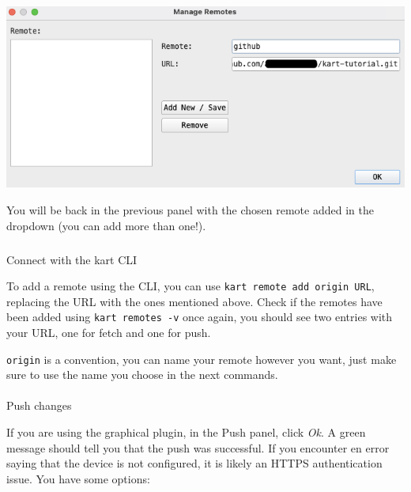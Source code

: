 \documentclass[
  letterpaper,
  DIV=11,
  numbers=noendperiod]{scrartcl}
\makeatletter
\let\oldparagraph\paragraph
\renewcommand{\paragraph}{
    \@ifstar
      \xxxParagraphStar
      \xxxParagraphNoStar
  }
\newcommand{\xxxParagraphStar}[1]{\oldparagraph*{#1}\mbox{}}
\newcommand{\xxxParagraphNoStar}[1]{\oldparagraph{#1}\mbox{}}
\let\oldsubparagraph\subparagraph
\renewcommand{\subparagraph}{
    \@ifstar
      \xxxSubParagraphStar
      \xxxSubParagraphNoStar
  }
\newcommand{\xxxSubParagraphStar}[1]{\oldsubparagraph*{#1}\mbox{}}
\newcommand{\xxxSubParagraphNoStar}[1]{\oldsubparagraph{#1}\mbox{}}
\makeatother
\begin{document}
\begin{center}
\includegraphics{img/kart-panel-remotes-add.png}
\end{center}

You will be back in the previous panel with the chosen remote added in
the dropdown (you can add more than one!).

\subparagraph{Connect with the kart
CLI}\label{connect-with-the-kart-cli}

To add a remote using the CLI, you can use
\texttt{kart\ remote\ add\ origin\ URL}, replacing the URL with the ones
mentioned above. Check if the remotes have been added using
\texttt{kart\ remotes\ -v} once again, you should see two entries with
your URL, one for fetch and one for push.

\begin{tcolorbox}[enhanced jigsaw, arc=.35mm, colbacktitle=quarto-callout-note-color!10!white, colframe=quarto-callout-note-color-frame, coltitle=black, breakable, left=2mm, bottomrule=.15mm, rightrule=.15mm, opacitybacktitle=0.6, titlerule=0mm, opacityback=0, toptitle=1mm, title=\textcolor{quarto-callout-note-color}{\faInfo}\hspace{0.5em}{Note}, toprule=.15mm, bottomtitle=1mm, colback=white, leftrule=.75mm]

\texttt{origin} is a convention, you can name your remote however you
want, just make sure to use the name you choose in the next commands.

\end{tcolorbox}

\paragraph{Push changes}\label{push-changes}

If you are using the graphical plugin, in the Push panel, click
\emph{Ok}. A green message should tell you that the push was successful.
If you encounter en error saying that the device is not configured, it
is likely an HTTPS authentication issue. You have some options:
\end{document}
